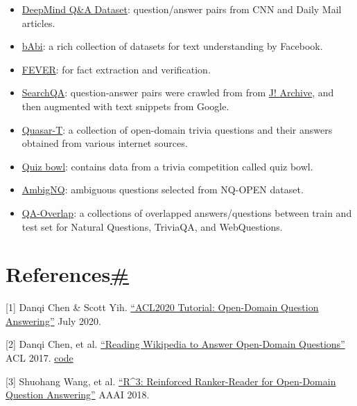 \begin{itemize}
  \href{https://www.kaggle.com/tunguz/200000-jeopardy-questions}{Jeopardy! Questions}: contains 200,000+ \href{https://en.wikipedia.org/wiki/Jeopardy!}{Jeopardy!} questions.
\item
  \href{https://cs.nyu.edu/~kcho/DMQA/}{DeepMind Q\&A Dataset}: question/answer pairs from CNN and Daily Mail articles.
\item
  \href{https://research.fb.com/downloads/babi/}{bAbi}: a rich collection of datasets for text understanding by Facebook.
\item
  \href{https://fever.ai/data.html}{FEVER}: for fact extraction and verification.
\item
  \href{https://github.com/nyu-dl/dl4ir-searchQA}{SearchQA}: question-answer pairs were crawled from from \href{https://j-archive.com/}{J! Archive}, and then augmented with text snippets from Google.
\item
  \href{https://github.com/bdhingra/quasar}{Quasar-T}: a collection of open-domain trivia questions and their answers obtained from various internet sources.
\item
  \href{https://people.cs.umass.edu/~miyyer/qblearn/index.html}{Quiz bowl}: contains data from a trivia competition called quiz bowl.
\item
  \href{https://nlp.cs.washington.edu/ambigqa/}{AmbigNQ}: ambiguous questions selected from NQ-OPEN dataset.
\item
  \href{https://github.com/facebookresearch/QA-Overlap}{QA-Overlap}: a collections of overlapped answers/questions between train and test set for Natural Questions, TriviaQA, and WebQuestions.
\end{itemize}

\section{\texorpdfstring{References\hyperref[references]{\#}}{References\#}}\label{references}

{[}1{]} Danqi Chen \& Scott Yih. \href{https://github.com/danqi/acl2020-openqa-tutorial}{``ACL2020 Tutorial: Open-Domain Question Answering''} July 2020.

{[}2{]} Danqi Chen, et al. \href{https://arxiv.org/abs/1704.00051}{``Reading Wikipedia to Answer Open-Domain Questions''} ACL 2017. \textbar{} \href{https://github.com/facebookresearch/DrQA}{code}

{[}3{]} Shuohang Wang, et al. \href{https://arxiv.org/abs/1709.00023}{``R\^{}3: Reinforced Ranker-Reader for Open-Domain Question Answering''} AAAI 2018.

